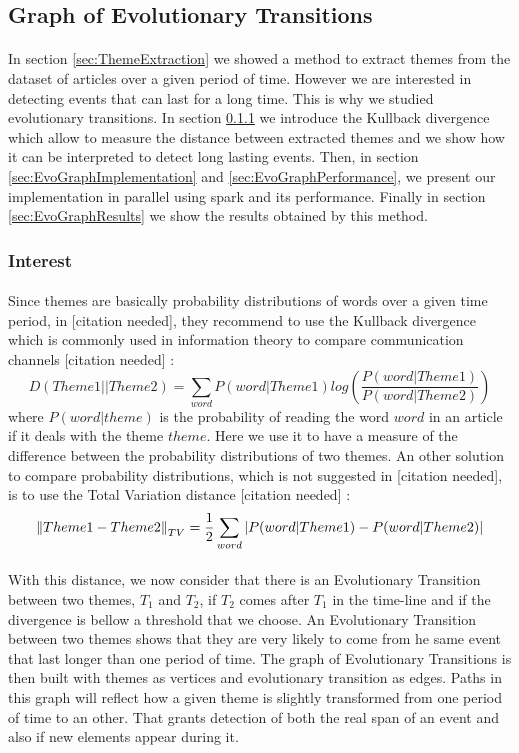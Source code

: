 \subsection{Graph of Evolutionary Transitions}
\paragraph{}
In section \ref{sec:ThemeExtraction} we showed a method to extract themes from the dataset of articles over a given period of time. However we are interested in detecting events that can last for a long time. This is why we studied evolutionary transitions. In section \ref{sec:EvoGraphInterest} we introduce the Kullback divergence which allow to measure the distance between extracted themes and we show how it can be interpreted to detect long lasting events. Then, in section \ref{sec:EvoGraphImplementation} and \ref{sec:EvoGraphPerformance}, we present our implementation in parallel using spark and its performance. Finally in section \ref{sec:EvoGraphResults} we show the results obtained by this method.

\subsubsection{Interest}
\label{sec:EvoGraphInterest}

\paragraph{}
Since themes are basically probability distributions of words over a given time period, in [citation needed], they recommend to use the Kullback divergence which is commonly used in information theory to compare communication channels [citation needed] :\[ D(Theme1 || Theme2) = \sum_{word} P(word|Theme1) log(\frac{P(word|Theme1)}{P(word|Theme2)})\]where $P(word|theme)$ is the probability of reading the word $word$ in an article if it deals with the theme $theme$. Here we use it to have a measure of the difference between the probability distributions of two themes. An other solution to compare probability distributions, which is not suggested in [citation needed], is to use the Total Variation distance [citation needed] :\[ \left\lVert Theme1 - Theme2\right\rVert_{TV} = \frac{1}{2} \sum_{word} |P(word|Theme1) - P(word|Theme2)|\]

\paragraph{}
With this distance, we now consider that there is an Evolutionary Transition between two themes, $T_1$ and $T_2$, if $T_2$ comes after $T_1$ in the time-line and if the divergence is bellow a threshold that we choose. An Evolutionary Transition between two themes shows that they are very likely to come from he same event that last longer than one period of time. The graph of Evolutionary Transitions is then built with themes as vertices and evolutionary transition as edges. Paths in this graph will reflect how a given theme is slightly transformed from one period of time to an other. That grants detection of both the real span of an event and also if new elements appear during it.

